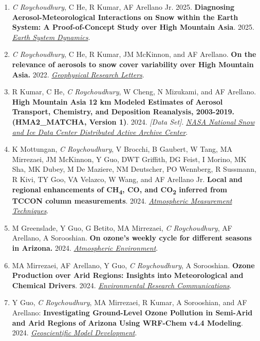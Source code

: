 \documentclass[margin,line]{resume}
\begin{document}
\begin{resume}
\begin{enumerate}[topsep=1pt, partopsep=1pt, itemsep=0.5pt, parsep=0.1pt, leftmargin=15pt,label=\arabic*.]
			\item \textit{C Roychoudhury}, C He, R Kumar, AF Arellano Jr. 2025.  \textbf{Diagnosing Aerosol-Meteorological Interactions on Snow within the Earth System: A Proof-of-Concept Study over High Mountain Asia}. 2025.  \emph{\href{https://esd.copernicus.org/articles/16/1237/2025/}{Earth System Dynamics}}.
			
			\item \textit{C Roychoudhury}, C He, R Kumar, JM McKinnon, and AF Arellano. \textbf{On the relevance of aerosols to snow cover variability over High Mountain Asia.} 2022.  \href{https://doi.org/10.1029/2022GL099317}{\textit{Geophysical Research Letters}}.
			
			\item R Kumar, C He, \textit{C Roychoudhury}, W Cheng, N Mizukami, and AF Arellano. \textbf{High Mountain Asia 12 km Modeled Estimates of Aerosol Transport, Chemistry, and Deposition Reanalysis, 2003-2019. (HMA2\_MATCHA, Version 1)}. 2024. \textit{[Data Set]}. \href{https://doi.org/10.5067/CG4OT8DJX2Z7}{\textit{NASA National Snow and Ice Data Center Distributed Active Archive Center}}.
			
			\item K Mottungan, \textit{C Roychoudhury}, V Brocchi, B Gaubert, W Tang, MA Mirrezaei, JM McKinnon, Y Guo, DWT Griffith, DG Feist, I Morino, MK Sha, MK Dubey, M De Maziere, NM Deutscher, PO Wennberg, R Sussmann, R Kivi, TY Goo, VA Velazco, W Wang, and AF Arellano Jr. \textbf{Local and regional enhancements of CH\textsubscript{4}, CO, and CO\textsubscript{2} inferred from TCCON column measurements}. 2024.  \href{https://doi.org/10.5194/amt-17-5861-2024}{\textit{Atmospheric Measurement Techniques}}.
			
			\item M Greenslade, Y Guo, G Betito, MA Mirrezaei, \textit{C Roychoudhury}, AF Arellano, A Sorooshian. \textbf{On ozone's weekly cycle for different seasons in Arizona.} 2024. \href{https://doi.org/10.1016/j.atmosenv.2024.120703}{\textit{Atmospheric Environment}}.
			
			\item MA Mirrezaei, AF Arellano, Y Guo, \textit{C Roychoudhury}, A Sorooshian. \textbf{Ozone Production over Arid Regions: Insights into Meteorological and Chemical Drivers}. 2024. \href{https://10.1088/2515-7620/ad484c}{\textit{Environmental Research Communications}}.
			
			\item Y Guo, \textit{C Roychoudhury}, MA Mirrezaei, R Kumar, A Sorooshian, and AF Arellano: \textbf{Investigating Ground-Level Ozone Pollution in Semi-Arid and Arid Regions of Arizona Using WRF-Chem v4.4 Modeling}. 2024.
			\href{ https://doi.org/10.5194/gmd-17-4331-2024}{\textit{Geoscientific Model Development}}.
			

\end{enumerate}
\end{resume}
\end{document}
